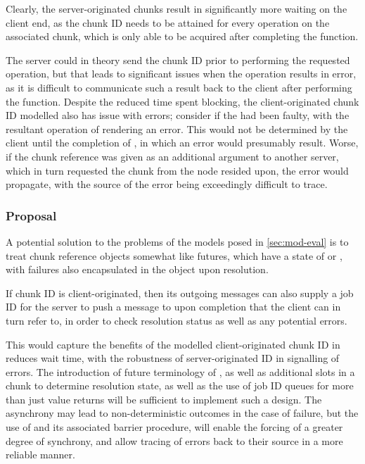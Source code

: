 Clearly, the server-originated chunks result in significantly more waiting on the client end, as the chunk ID needs to be attained for every operation on the associated chunk, which is only able to be acquired after completing the function.

The server could in theory send the chunk ID prior to performing the requested operation, but that leads to significant issues when the operation results in error, as it is difficult to communicate such a result back to the client after performing the function.
Despite the reduced time spent blocking, the client-originated chunk ID modelled also has issue with errors; consider if the  had been faulty, with the resultant operation of  rendering an error.
This would not be determined by the client until the completion of , in which an error would presumably result.
Worse, if the chunk reference  was given as an additional argument to another server, which in turn requested the chunk  from the node  resided upon, the error would propagate, with the source of the error being exceedingly difficult to trace.

\subsubsection{Proposal}

A potential solution to the problems of the models posed in \cref{sec:mod-eval} is to treat chunk reference objects somewhat like futures, which have a state of  or , with failures also encapsulated in the object upon resolution\cite{bengtsson20:future-r}.

If chunk ID is client-originated, then its outgoing messages can also supply a job ID for the server to push a message to upon completion that the client can in turn refer to, in order to check resolution status as well as any potential errors.

This would capture the benefits of the modelled client-originated chunk ID in reduces wait time, with the robustness of server-originated ID in signalling of errors.
The introduction of future terminology of , as well as additional slots in a chunk to determine resolution state, as well as the use of job ID queues for more than just value returns will be sufficient to implement such a design.
The asynchrony may lead to non-deterministic outcomes in the case of failure, but the use of  and its associated barrier procedure,  will enable the forcing of a greater degree of synchrony, and allow tracing of errors back to their source in a more reliable manner.

